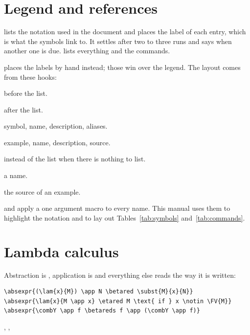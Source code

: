 \documentclass[11pt,a4paper]{article}
\newcommand*\cs[1]{\blatex{\\#1}}
\begin{document}
\section{Legend and references}

\cs{absintlegend} lists the notation used in the document and places the
label of each entry, which is what the symbols link to.  It settles after two
to three runs and says when another one is due.  \blatex{\\absintlegend*} lists
everything and \cs{absintcommands} the commands.

 places the labels by hand instead; those win
over the legend.  The layout comes from these hooks:

\begin{description}[leftmargin=4.2cm]
  \item[absintlegendstart] before the list.
  \item[absintlegendstop] after the list.
  \item[absintlegendentry] symbol, name, description, aliases.
  \item[absintcommandentry] example, name, description, source.
  \item[absintlegendempty] instead of the list when there is nothing to list.
  \item[absintname] a name.
  \item[absintdemo] the source of an example.
\end{description}

\cs{absintforallsymbols} and \cs{absintforallcommands} apply a one argument
macro to every name.  This manual uses them to highlight the notation and to
lay out Tables~\ref{tab:symbols} and~\ref{tab:commands}.

\section{Lambda calculus}

Abstraction is \cs{lam}, application is \cs{app} and everything else reads
the way it is written:

\begin{verbatim}
\absexpr{(\lam{x}{M}) \app N \betared \subst{M}{x}{N}}
\absexpr{\lam{x}{M \app x} \etared M \text{ if } x \notin \FV{M}}
\absexpr{\combY \app f \betareds f \app (\combY \app f)}
\end{verbatim}

, \quad
{}, \quad
{}
\end{document}
